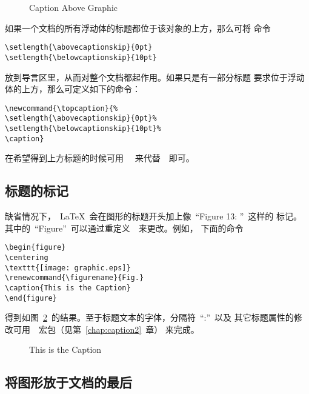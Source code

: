 \begin{figure}
	\setlength{\abovecaptionskip}{0pt}
	\setlength{\belowcaptionskip}{10pt}
	\centering
	\caption{Caption Above Graphic}\label{fig:normalabovefig}
	\resizebox{2in}{!}{\usebox{\graphic}}
\end{figure}

如果一个文档的所有浮动体的标题都位于该对象的上方，那么可将
命令
\begin{Verbatim}[xleftmargin=1cm]
\setlength{\abovecaptionskip}{0pt}
\setlength{\belowcaptionskip}{10pt}
\end{Verbatim}
放到导言区里，从而对整个文档都起作用。如果只是有一部分标题
要求位于浮动体的上方，那么可定义如下的命令：
\begin{Verbatim}[xleftmargin=1cm]
\newcommand{\topcaption}{% 
\setlength{\abovecaptionskip}{0pt}% 
\setlength{\belowcaptionskip}{10pt}% 
\caption}
\end{Verbatim}
在希望得到上方标题的时候可用~~
来代替~~即可。

\subsection{标题的标记}\label{ssec:captionlabel}

缺省情况下，~\LaTeX{}~会在图形的标题开头加上像~``Figure 13: ''~这样的
标记。其中的~``Figure''~可以通过重定义~~来更改。例如，
下面的命令
\begin{Verbatim}[xleftmargin=1cm]
\begin{figure} 
\centering 
\texttt{[image: graphic.eps]} 
\renewcommand{\figurename}{Fig.} 
\caption{This is the Caption} 
\end{figure}
\end{Verbatim}
得到如图~\ref{fig:figname}~的结果。至于标题文本的字体，分隔符~``:''~以及
其它标题属性的修改可用~~宏包（见第~\ref{chap:caption2}~章）
来完成。

\clearpage

\begin{figure} 
	\centering
	\resizebox{2in}{!}{\usebox{\graphic}}
	\renewcommand{\figurename}{Fig.} 
	\caption{This is the Caption}\label{fig:figname} 
\end{figure}

\subsection{将图形放于文档的最后}\label{ssec:endfloat}

